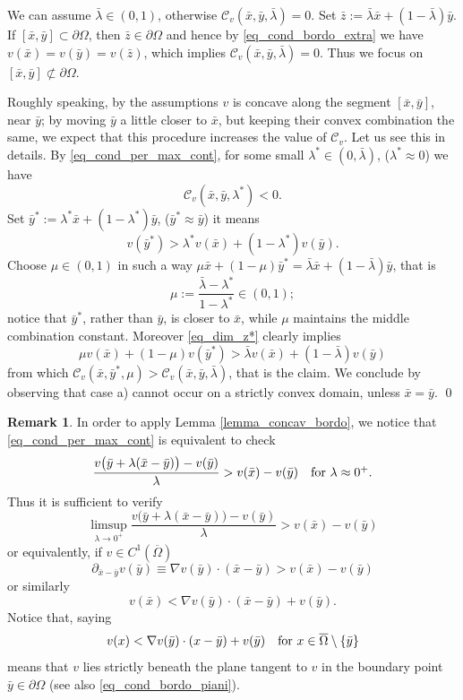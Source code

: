 \documentclass[11pt, reqno]{amsart}
\theoremstyle{definition}
\newtheorem{remark}[lemma]{Remark}
\numberwithin{equation}{section}
\newcommand{\mc}[1]{\mathcal{#1}}
\renewenvironment{proof}[1][\proofname]{\medskip \noindent {\bfseries #1. }}{\qed \bigskip}
\begin{document}
\begin{proof}
We can assume $\bar{\lambda}\in (0,1)$, otherwise $\mc{C}_v(\bar{x},\bar{y}, \bar{\lambda})=0$. Set $\bar{z}:= \bar{\lambda} \bar{x} + (1-\bar{\lambda})\bar{y}$. 
If $[\bar{x},\bar{y}]\subset \partial \Omega$, then $\bar{z} \in \partial \Omega$ and hence by \eqref{eq_cond_bordo_extra} we have $v(\bar{x})=v(\bar{y})=v(\bar{z})$, which implies $\mc{C}_v(\bar{x},\bar{y}, \bar{\lambda}) =0$. 
Thus we focus on $[\bar{x},\bar{y}] \not \subset \partial \Omega$.

Roughly speaking, by the assumptions $v$ is concave along the segment $[\bar{x},\bar{y}]$, near $\bar{y}$; by moving $\bar{y}$ a little closer to $\bar{x}$, but keeping their convex combination the same, we expect that this procedure increases the value of $\mc{C}_v$.
Let us see this in details. 
By \eqref{eq_cond_per_max_cont}, for some small $\lambda^* \in (0, \bar{\lambda})$, ($\lambda^* \approx 0$) we have
$$\mc{C}_v(\bar{x},\bar{y},\lambda^*)< 0.$$
Set $\bar{y}^*:=\lambda^* \bar{x} + (1-\lambda^*) \bar{y}$, ($\bar{y}^* \approx \bar{y}$) it means
\begin{equation}\label{eq_dim_z*}
v(\bar{y}^*) > \lambda^*v(\bar{x}) + (1-\lambda^*) v(\bar{y}).
\end{equation}
Choose $\mu \in (0,1)$ in such a way 
$\mu \bar{x} + (1-\mu) \bar{y}^* = \bar{\lambda} \bar{x} + (1-\bar{\lambda})\bar{y}$, 
that is
$$\mu:= \frac{\bar{\lambda}-\lambda^*}{1-\lambda^*} \in (0,1);$$
notice that $\bar{y}^*$, rather than $\bar{y}$, is closer to $\bar{x}$, while $\mu$ maintains the middle combination constant.
Moreover \eqref{eq_dim_z*} clearly implies
$$\mu v(\bar{x}) + (1-\mu) v(\bar{y}^*) > \bar{\lambda} v(\bar{x}) + (1-\bar{\lambda}) v(\bar{y})$$
from which $\mc{C}_v(\bar{x}, \bar{y}^*, \mu) > \mc{C}_v(\bar{x},\bar{y},\bar{\lambda})$, that is the claim. 
We conclude by observing that case a) cannot occur on a strictly convex domain, unless $\bar{x}=\bar{y}$.
\end{proof}

\begin{remark}
\label{rem_direction_derivat}
In order to apply Lemma \ref{lemma_concav_bordo}, we notice that \eqref{eq_cond_per_max_cont} is equivalent to check
$$ \frac{v\big(\bar{y} + \lambda(\bar{x}-\bar{y})\big)-v(\bar{y})}{\lambda} > v(\bar{x})-v(\bar{y}) \quad \hbox{for $\lambda \approx 0^+$}.$$
Thus it is sufficient to verify
\begin{equation}\label{eq_rem_implic_Cv}
\limsup_{\lambda \to 0^+} \frac{v\big(\bar{y} + \lambda(\bar{x}-\bar{y})\big)-v(\bar{y})}{\lambda} > v(\bar{x})- v(\bar{y}) 
\end{equation}
or equivalently, if $v \in C^1(\overline{\Omega})$ 
$$\partial_{\bar{x}-\bar{y}} v(\bar{y}) \equiv \nabla v(\bar{y}) \cdot (\bar{x}-\bar{y}) > v(\bar{x})-v(\bar{y})$$
or similarly
$$v(\bar{x}) < \nabla v(\bar{y}) \cdot (\bar{x}-\bar{y}) + v(\bar{y}).$$
Notice that, saying
$$v(x) < \nabla v(\bar{y}) \cdot (x-\bar{y}) + v(\bar{y}) \quad \hbox{for $x \in \overline{\Omega}\setminus\{\bar{y}\}$}$$
means that $v$ lies strictly beneath the plane tangent to $v$ in the boundary point $\bar{y} \in \partial \Omega$ (see also \eqref{eq_cond_bordo_piani}).
\end{remark}
\end{document}
